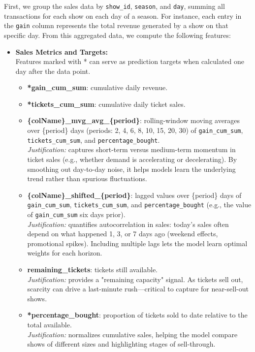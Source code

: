 \documentclass[a4paper,12pt]{report}  %
\begin{document}
First, we group the sales data by \texttt{show\_id}, \texttt{season}, and \texttt{day}, summing all transactions for each show on each day of a season. For instance, each entry in the \texttt{gain} column represents the total revenue generated by a show on that specific day. From this aggregated data, we compute the following features:

\begin{itemize}
	\item \textbf{Sales Metrics and Targets:}\\
	      Features marked with * can serve as prediction targets when calculated one day after the data point.
	      \begin{itemize}
		      \item \textbf{*gain\_cum\_sum}: cumulative daily revenue.
		      \item \textbf{*tickets\_cum\_sum}: cumulative daily ticket sales.
		      \item \textbf{\{colName\}\_mvg\_avg\_\{period\}}: rolling-window moving averages over \{period\} days (periods: 2, 4, 6, 8, 10, 15, 20, 30) of \texttt{gain\_cum\_sum}, \texttt{tickets\_cum\_sum}, and \texttt{percentage\_bought}.  \\
		            \emph{Justification:} captures short-term versus medium-term momentum in ticket sales (e.g., whether demand is accelerating or decelerating). By smoothing out day-to-day noise, it helps models learn the underlying trend rather than spurious fluctuations.
		      \item \textbf{\{colName\}\_shifted\_\{period\}}: lagged values over \{period\} days of \texttt{gain\_cum\_sum}, \texttt{tickets\_cum\_sum}, and \texttt{percentage\_bought} (e.g., the value of \texttt{gain\_cum\_sum} six days prior).  \\
		            \emph{Justification:} quantifies autocorrelation in sales: today's sales often depend on what happened 1, 3, or 7 days ago (weekend effects, promotional spikes). Including multiple lags lets the model learn optimal weights for each horizon.
		      \item \textbf{remaining\_tickets}: tickets still available.  \\
		            \emph{Justification:} provides a "remaining capacity" signal. As tickets sell out, scarcity can drive a last-minute rush—critical to capture for near-sell-out shows.
		      \item \textbf{*percentage\_bought}: proportion of tickets sold to date relative to the total available.  \\
		            \emph{Justification:} normalizes cumulative sales, helping the model compare shows of different sizes and highlighting stages of sell-through.
	      \end{itemize}


\end{itemize}
\end{document}
